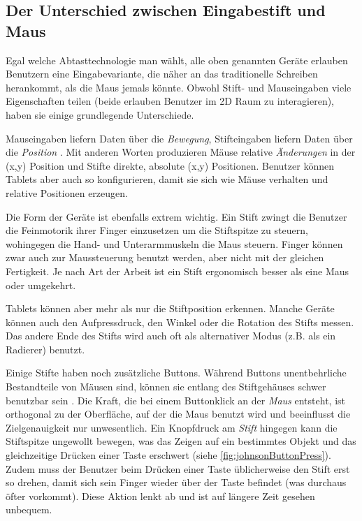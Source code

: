 \subsection{Der Unterschied zwischen Eingabestift und Maus}  

Egal welche Abtasttechnologie man wählt, alle oben genannten Geräte erlauben Benutzern eine Eingabevariante, die näher an das traditionelle Schreiben herankommt, als die Maus jemals könnte. Obwohl Stift- und Mauseingaben viele Eigenschaften teilen (beide erlauben Benutzer im 2D Raum zu interagieren), haben sie einige grundlegende Unterschiede.

\medskip Mauseingaben liefern Daten über die \emph{Bewegung}, Stifteingaben liefern Daten über die \emph{Position} \citep{Hinckley:2002}. Mit anderen Worten produzieren Mäuse relative \emph{Änderungen} in der (x,y) Position und Stifte direkte, absolute (x,y) Positionen. Benutzer können Tablets aber auch so konfigurieren, damit sie sich wie Mäuse verhalten und relative Positionen erzeugen.

\medskip Die Form der Geräte ist ebenfalls extrem wichtig. Ein Stift zwingt die Benutzer die Feinmotorik ihrer Finger einzusetzen um die Stiftspitze zu steuern, wohingegen die Hand- und Unterarmmuskeln die Maus steuern. Finger können zwar auch zur Maussteuerung benutzt werden, aber nicht mit der gleichen Fertigkeit. Je nach Art der Arbeit ist ein Stift ergonomisch besser als eine Maus oder umgekehrt.

Tablets können aber mehr als nur die Stiftposition erkennen. Manche Geräte können auch den Aufpressdruck, den Winkel oder die Rotation des Stifts messen. Das andere Ende des Stifts wird auch oft als alternativer Modus (z.B. als ein Radierer) benutzt. 

Einige Stifte haben noch zusätzliche Buttons. Während Buttons unentbehrliche Bestandteile von Mäusen sind, können sie entlang des Stiftgehäuses schwer benutzbar sein \citep{Plimmer:2008}. Die Kraft, die bei einem Buttonklick an der \emph{Maus} entsteht, ist orthogonal zu der Oberfläche, auf der die Maus benutzt wird und beeinflusst die Zielgenauigkeit nur unwesentlich. Ein Knopfdruck am \emph{Stift} hingegen kann die Stiftspitze ungewollt bewegen, was das Zeigen auf ein bestimmtes Objekt und das gleichzeitige Drücken einer Taste erschwert (siehe \autoref{fig:johnsonButtonPress}). Zudem muss der Benutzer beim Drücken einer Taste üblicherweise den Stift erst so drehen, damit sich sein Finger wieder über der Taste befindet (was durchaus öfter vorkommt). Diese Aktion lenkt ab und ist auf längere Zeit gesehen unbequem. \citep{Johnson:2009}

